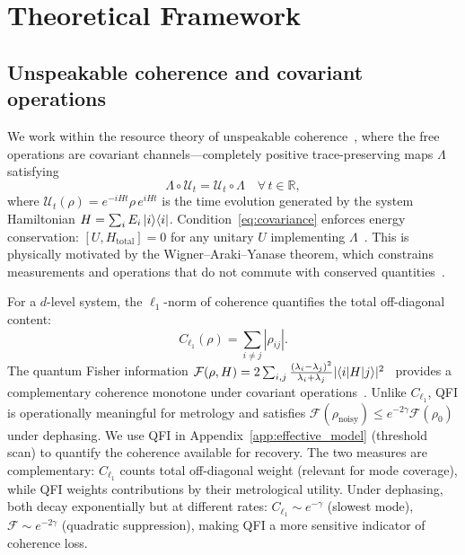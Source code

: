 \documentclass[pra,twocolumn,superscriptaddress,longbibliography,floatfix]{revtex4-2}
\begin{document}
\section{Theoretical Framework}
\label{sec:theory}

\subsection{Unspeakable coherence and covariant operations}
\label{sec:covariant}

We work within the resource theory of unspeakable coherence~\cite{Shiraishi2024,Marvian2013,Marvian2014,Lostaglio2019}, where the free operations are covariant channels---completely positive trace-preserving maps $\Lambda$ satisfying
\begin{equation}
\Lambda \circ \mathcal{U}_t = \mathcal{U}_t \circ \Lambda \quad \forall\, t \in \mathbb{R},
\label{eq:covariance}
\end{equation}
where $\mathcal{U}_t(\rho) = e^{-iHt} \rho\, e^{iHt}$ is the time evolution generated by the system Hamiltonian $H = \sum_i E_i \ket{i}\!\bra{i}$.
Condition~\eqref{eq:covariance} enforces energy conservation: $[U, H_\mathrm{total}] = 0$ for any unitary $U$ implementing $\Lambda$~\cite{Marvian2014}.
This is physically motivated by the Wigner--Araki--Yanase theorem, which constrains measurements and operations that do not commute with conserved quantities~\cite{Wigner1952}.

For a $d$-level system, the $\ell_1$-norm of coherence quantifies the total off-diagonal content:
\begin{equation}
C_{\ell_1}(\rho) = \sum_{i \neq j} |\rho_{ij}|.
\label{eq:l1coherence}
\end{equation}
The quantum Fisher information $\mathcal{F}(\rho, H) = 2 \sum_{i,j} \frac{(\lambda_i - \lambda_j)^2}{\lambda_i + \lambda_j} |\!\braket{i|H|j}\!|^2$~\cite{Braunstein1994} provides a complementary coherence monotone under covariant operations~\cite{Shiraishi2024}.
Unlike $C_{\ell_1}$, QFI is operationally meaningful for metrology and satisfies $\mathcal{F}(\rho_\mathrm{noisy}) \leq e^{-2\gamma} \mathcal{F}(\rho_0)$ under dephasing.
We use QFI in Appendix~\ref{app:effective_model} (threshold scan) to quantify the coherence available for recovery.
The two measures are complementary: $C_{\ell_1}$ counts total off-diagonal weight (relevant for mode coverage), while QFI weights contributions by their metrological utility.
Under dephasing, both decay exponentially but at different rates: $C_{\ell_1} \sim e^{-\gamma}$ (slowest mode), $\mathcal{F} \sim e^{-2\gamma}$ (quadratic suppression), making QFI a more sensitive indicator of coherence loss.
\end{document}
